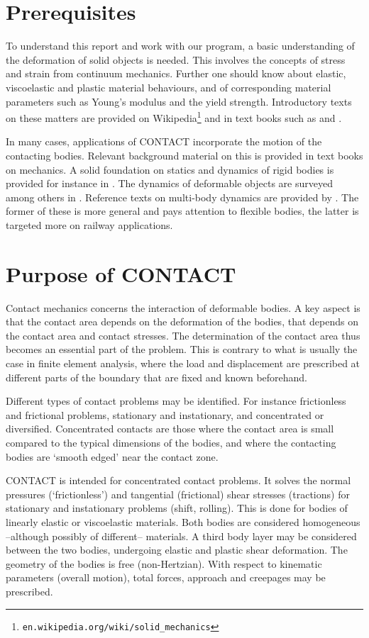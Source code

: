 \documentclass[12pt]{report}
\begin{document}
\section{Prerequisites}

To understand this report and work with our program, a basic understanding
of the deformation of solid objects is needed. This involves the concepts
of stress and strain from continuum mechanics. Further one should know
about elastic, viscoelastic and plastic material behaviours, and of
corresponding material parameters such as Young's modulus and the yield
strength. Introductory texts on these matters are provided on
Wikipedia\footnote{{\tt en.wikipedia.org/wiki/solid\_mechanics}} and in
text books such as \cite{Bower2008} and \cite{Naghdi2001}.

In many cases, applications of CONTACT incorporate the motion of the contacting
bodies. Relevant background material on this is provided in text books on
mechanics. A solid foundation on statics and dynamics of rigid bodies is
provided for instance in \cite{Hibbeler2012}. The dynamics of deformable
objects are surveyed among others in \cite{Craig2006}. Reference texts on
multi-body dynamics are provided by \cite{Shabana2013,Shabana2008}. The
former of these is more general and pays attention to flexible bodies, the
latter is targeted more on railway applications.

\section{Purpose of CONTACT}

Contact mechanics concerns the interaction of deformable bodies. A key
aspect is that the contact area depends on the deformation of the bodies,
that depends on the contact area and contact stresses. The determination of
the contact area thus becomes an essential part of the problem.
This is contrary to what is usually the case in finite element analysis,
where the load and displacement are prescribed at different parts of the
boundary that are fixed and known beforehand.

Different types of contact problems may be identified. For instance
frictionless and frictional problems, stationary and instationary, and
concentrated or diversified. Concentrated contacts are those where the
contact area is small compared to the typical dimensions of the bodies,
and where the contacting bodies are `smooth edged' near the contact zone.

CONTACT is intended for concentrated contact problems. It solves the normal
pressures (`frictionless') and tangential (frictional) shear stresses
(tractions) for stationary and instationary problems (shift, rolling). This
is done for bodies of linearly elastic or viscoelastic materials. Both
bodies are considered homogeneous --although possibly of different--
materials. A third body layer may be considered between the two bodies,
undergoing elastic and plastic shear deformation. The geometry of the bodies
is free (non-Hertzian). With respect to kinematic parameters (overall
motion), total forces, approach and creepages may be prescribed.
\end{document}

